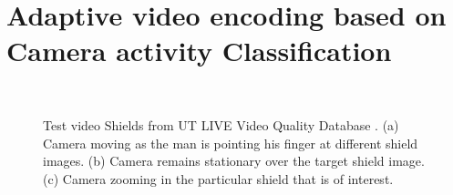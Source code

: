 \documentclass{book}
\begin{document}
\chapter{ Adaptive video encoding based on Camera activity Classification}
\label{chap:3}
\begin{figure}[t!]
	\centering
	 \\
	\caption{\label{fig:shields}
		Test video Shields from UT LIVE Video Quality Database \cite{Kalpana}.
		(a) Camera moving as the man is pointing his finger at different shield images.
		(b) Camera remains stationary over the target shield image.
		(c) Camera zooming in the particular shield that is of interest.}
\end{figure}
\end{document}
